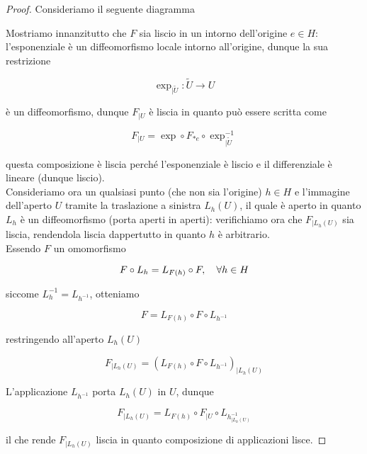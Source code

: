\begin{proof}
	Consideriamo il seguente diagramma
	
	
	Mostriamo innanzitutto che $ F $ sia liscio in un intorno dell'origine $ e \in H $: l'esponenziale è un diffeomorfismo locale intorno all'origine, dunque la sua restrizione
	
	\begin{equation}
		\exp_{| \tilde{U}} : \tilde{U} \to U
	\end{equation}

	è un diffeomorfismo, dunque $ F_{| U} $ è liscia in quanto può essere scritta come
	
	\begin{equation}
		F_{| U} = \exp \circ F_{*e} \circ \exp_{| \tilde{U}}^{-1}
	\end{equation}

	questa composizione è liscia perché l'esponenziale è liscio e il differenziale è lineare (dunque liscio).\\
	Consideriamo ora un qualsiasi punto (che non sia l'origine) $ h \in H $ e l'immagine dell'aperto $ U $ tramite la traslazione a sinistra $ L_{h}(U) $, il quale è aperto in quanto $ L_{h} $ è un diffeomorfismo (porta aperti in aperti): verifichiamo ora che $ F_{| L_{h}(U)} $ sia liscia, rendendola liscia dappertutto in quanto $ h $ è arbitrario.\\
	Essendo $ F $ un omomorfismo
	
	\begin{equation}
		F \circ L_{h} = L_{F(h)} \circ F \qcomma \forall h \in H
	\end{equation}

	siccome $ L_{h}^{-1} = L_{h^{-1}} $, otteniamo
	
	\begin{equation}
		F = L_{F(h)} \circ F \circ L_{h^{-1}}
	\end{equation}

	restringendo all'aperto $ L_{h}(U) $
	
	\begin{equation}
		F_{| L_{h}(U)} = (L_{F(h)} \circ F \circ L_{h^{-1}})_{| L_{h}(U)}
	\end{equation}

	L'applicazione $ L_{h^{-1}} $ porta $ L_{h}(U) $ in $ U $, dunque
	
	\begin{equation}
		F_{| L_{h}(U)} = L_{F(h)} \circ F_{| U} \circ L_{h^{-1}_{| L_{h}(U)}}
	\end{equation}

	il che rende $ F_{| L_{h}(U)} $ liscia in quanto composizione di applicazioni lisce.
\end{proof}

